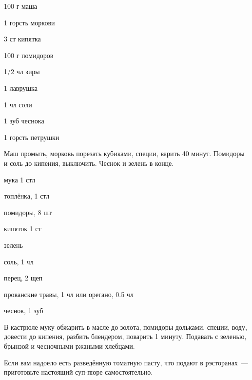  
{
\item 100 г маша
\item 1 горсть моркови
\item 3 ст кипятка
\item 100 г помидоров
}{
\item 1/2 чл зиры
\item 1 лаврушка
\item 1 чл соли
\item 1 зуб чеснока
\item 1 горсть петрушки
}{
Маш промыть, морковь порезать кубиками, специи, варить 40 минут. Помидоры и соль до кипения, выключить. Чеснок и зелень в конце.
}{}{}




{
\item мука 1 стл
\item топлёнка, 1 стл
\item помидоры, 8 шт
\item кипяток 1 ст
\item зелень
}{
\item соль, 1 чл
\item перец, 2 щеп
\item прованские травы, 1 чл или орегано, 0.5 чл
\item чеснок, 1 зуб
}{
В кастрюле муку обжарить в масле до золота, помидоры дольками, специи, воду, довести до кипения, разбить блендером, поварить 1 минуту. Подавать с зеленью, брынзой и чесночными ржаными хлебцами.
}{
\begin{advice}
\item Если вам надоело есть разведённую томатную пасту, что подают в рэсторанах~--- приготовьте настоящий суп-пюре самостоятельно.
\end{advice}}{}



